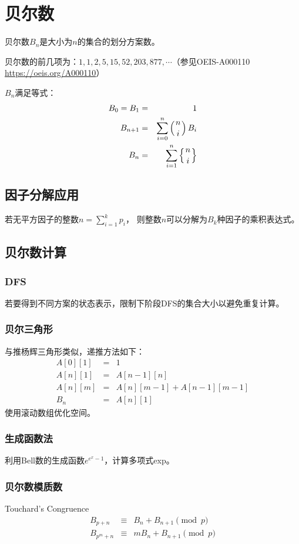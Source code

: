 \section{贝尔数}
贝尔数$B_n$是大小为$n$的集合的划分方案数。

贝尔数的前几项为：$1, 1, 2, 5, 15, 52, 203, 877,\cdots$（参见OEIS-A000110\\
\url{https://oeis.org/A000110}）

$B_n$满足等式：
\begin{eqnarray*}
	B_0=B_1&=&1\\
	B_{n+1}&=&\sum_{i=0}^n{\left(n \atop i\right)B_i}\\
	B_n&=&\sum_{i=1}^n{\left\{n \atop i\right\}}
\end{eqnarray*}

\subsection{因子分解应用}
若无平方因子的整数$\displaystyle n=\sum_{i=1}^k{p_i}$，
则整数$n$可以分解为$B_k$种因子的乘积表达式。
\subsection{贝尔数计算}
\subsubsection{DFS}若要得到不同方案的状态表示，限制下阶段DFS的集合大小以避免重复计算。
\subsubsection{贝尔三角形}
与推杨辉三角形类似，递推方法如下：
\begin{eqnarray*}
	A[0][1]&=&1\\
	A[n][1]&=&A[n-1][n]\\
	A[n][m]&=&A[n][m-1]+A[n-1][m-1]\\
	B_n&=&A[n][1]
\end{eqnarray*}
使用滚动数组优化空间。

\subsubsection{生成函数法}
利用Bell数的生成函数$e^{e^x-1}$，计算多项式exp。
\subsubsection{贝尔数模质数}
\begin{theorem}{Touchard's Congruence}
    \begin{eqnarray*}
        B_{p+n}&\equiv& B_n+B_{n+1}\pmod{p}\\
        B_{p^m+n}&\equiv& mB_n+B_{n+1}\pmod{p}\\
    \end{eqnarray*}
\end{theorem}

